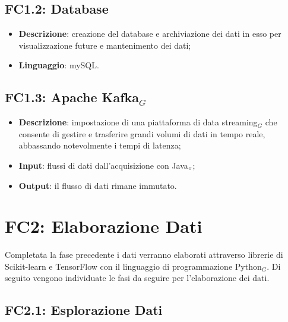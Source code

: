 \subsection{FC1.2: Database}\label{fasiProgettoAquisizioneDatiDatabase}

\begin{itemize}
	\item \textbf{Descrizione}: creazione del database e archiviazione dei dati in esso per visualizzazione future e mantenimento dei dati;
	\item \textbf{Linguaggio}: mySQL.
\end{itemize}

\subsection{FC1.3: Apache Kafka$_G$}\label{fasiProgettoAquisizioneDatiApacheKafka}

\begin{itemize}
	\item \textbf{Descrizione}: impostazione di una piattaforma di data streaming$_G$ che consente di gestire e trasferire grandi volumi di dati in tempo reale, abbassando notevolmente i tempi di latenza;
	\item \textbf{Input}: flussi di dati dall'acquisizione con Java$_{\scaleto{G}{3pt}}$;
		\item \textbf{Output}: il flusso di dati rimane immutato.
\end{itemize}


\section{FC2: Elaborazione Dati}\label{fasiProgettoElaborazioneDati}
Completata la fase precedente i dati verranno elaborati attraverso librerie di Scikit-learn e TensorFlow con il linguaggio di programmazione Python$_G$.
Di seguito vengono individuate le fasi da seguire per l'elaborazione dei dati.

\subsection{FC2.1: Esplorazione Dati}\label{fasiProgettoElaborazioneDatiEsplorazioneDati}

